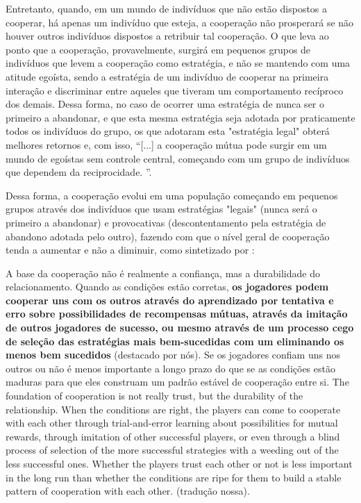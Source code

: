 Entretanto, quando, em um mundo de indivíduos que não estão dispostos a cooperar, há apenas um indivíduo que esteja, a cooperação não prosperará se não houver outros indivíduos dispostos a retribuir tal cooperação. O que leva ao ponto que a cooperação, provavelmente, surgirá em pequenos grupos de indivíduos que levem a cooperação como estratégia, e não se mantendo com uma atitude egoísta, sendo a estratégia de um indivíduo de cooperar na primeira interação e discriminar entre aqueles que tiveram um comportamento recíproco dos demais. Dessa forma, no caso de ocorrer uma estratégia de nunca ser o primeiro a abandonar, e que esta mesma estratégia seja adotada por praticamente todos os indivíduos do grupo, os que adotaram esta "estratégia legal" obterá melhores retornos e, com isso, \enquote{[...] a cooperação mútua pode surgir em um mundo de egoístas sem controle central, começando com um grupo de indivíduos que dependem da reciprocidade. }.

Dessa forma, a cooperação evolui em uma população começando em pequenos grupos através dos indivíduos que usam estratégias "legais" (nunca será o primeiro a abandonar) e provocativas (descontentamento pela estratégia de abandono adotada pelo outro), fazendo com que o nível geral de cooperação tenda a aumentar e não a diminuir, como sintetizado por \citep{Axelrod84}:

\citacao
	{%
		A base da cooperação não é realmente a confiança, mas a durabilidade do relacionamento. Quando as condições estão corretas, \textbf{os jogadores podem cooperar uns com os outros através do aprendizado por tentativa e erro sobre possibilidades de recompensas mútuas, através da imitação de outros jogadores de sucesso, ou mesmo através de um processo cego de seleção das estratégias mais bem-sucedidas com um eliminando os menos bem sucedidos} (destacado por nós). Se os jogadores confiam uns nos outros ou não é menos importante a longo prazo do que se as condições estão maduras para que eles construam um padrão estável de cooperação entre si.
	}{%
		The foundation of cooperation is not really trust, but the durability of the relationship. When the conditions are right, the players can come to cooperate with each other through trial-and-error learning about possibilities for mutual rewards, through imitation of other successful players, or even through a blind process of selection of the more successful strategies with a weeding out of the less successful ones. Whether the players trust each other or not is less important in the long run than whether the conditions are ripe for them to build a stable pattern of cooperation with each other.
	}
	{}
	{(tradução nossa).}
